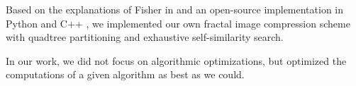  Based on the explanations of Fisher in \cite{fisher2012}
and an open-source implementation in Python \cite{github-python} and C++
\cite{github-cpp}, we implemented our own fractal image compression scheme with
quadtree partitioning and exhaustive self-similarity search.

In our work, we did not focus on algorithmic optimizations, but optimized the
computations of a given algorithm as best as we could.
